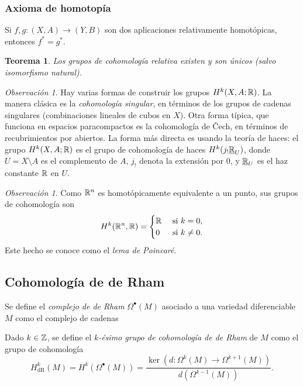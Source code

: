 \documentclass[11pt,a4paper]{amsbook}
\newtheorem{thm}[subsection]{Teorema}
\theoremstyle{remark} \newtheorem{rmk}[subsection]{Observación}
\theoremstyle{definition} \newtheorem{defn}[subsection]{Definición}
\theoremstyle{definition} \newtheorem{ex}[subsection]{Ejemplo}
\theoremstyle{definition} \newtheorem{ej}[subsection]{Ejercicio}
\begin{document}
\subsubsection{Axioma de homotopía} Si $f,g:(X,A)\rightarrow (Y,B)$ son dos aplicaciones relativamente homotópicas, entonces $f^*=g^*$.

\begin{thm}
Los grupos de cohomología relativa existen y son únicos (salvo isomorfismo natural).
\end{thm}

\begin{rmk}
Hay varias formas de construir los grupos $H^k(X,A;\mathbb R)$. La manera clásica es la \emph{cohomología singular}, en términos de los grupos de cadenas singulares (combinaciones lineales de cubos en $X$). Otra forma típica, que funciona en espacios paracompactos es la cohomología de \v{C}ech, en términos de recubrimientos por abiertos. La forma más directa es usando la teoría de haces: el grupo $H^k(X,A;\mathbb R)$ es el grupo de cohomología de haces $H^k(j_{!}\underline{\mathbb R}_U)$, donde $U=X\setminus A$ es el complemento de $A$, $j_!$ denota la extensión por $0$, y $\underline{\mathbb R}_U$ es el haz constante $\mathbb R$ en $U$.
\end{rmk}

\begin{rmk}
Como $\mathbb R^n$ es homotópicamente equivalente a un punto, sus grupos de cohomología son
  \begin{equation*}
    H^k(\mathbb R^n,\mathbb R) =
    \begin{cases}
\mathbb R & \text{ si } k= 0,\\
0 & \text{ si } k\neq 0.
\end{cases}
  \end{equation*}
  Este hecho se conoce como el \emph{lema de Poincaré}.
\end{rmk}

\subsection{Cohomología de de Rham}
  Se define el \emph{complejo de de Rham} $\Omega^\bullet(M)$ asociado a una variedad diferenciable $M$ como el complejo de cadenas
  \begin{center}
  \end{center}
  Dado $k\in \mathbb Z$, se define el \emph{$k$-ésimo grupo de cohomología de de Rham} de $M$ como el grupo de cohomología
  \begin{equation*}
H^k_{\mathrm{dR}}(M) = H^k(\Omega^\bullet(M)) = \frac{\ker(d:\Omega^k(M)\rightarrow \Omega^{k+1}(M))}{d(\Omega^{k-1}(M))}.
  \end{equation*}
\end{document}
